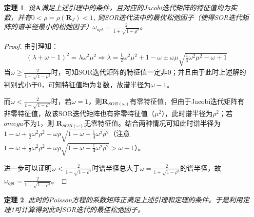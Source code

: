 \documentclass[12pt, a4paper]{article}
\newtheorem{theorem}{定理}
\begin{document}
\begin{theorem}
    设$\mathbf{A}$满足上述引理中的条件，且对应的Jacobi迭代矩阵的特征值均为实数，并有$0<\rho=\rho(\mathbf{R}_J)<1$,
    则SOR迭代法中的最优松弛因子（使得SOR迭代矩阵的谱半径最小的松弛因子）$\omega_{opt}=\frac{2}{1+\sqrt{1-\rho^2}}$。
\end{theorem}
\begin{proof}
由引理知：
    \begin{align}
        (\lambda+\omega-1)^2=\lambda\omega^2\mu^2\Rightarrow\lambda=\frac{1}{2}\omega^2\mu^2+1-\omega\pm\omega\mu\sqrt{\frac{1}{4}\omega^2\mu^2-\omega+1}
    \end{align}
当$\omega\geqslant\frac{2}{1+\sqrt{1-\rho^2}}$时，可知SOR迭代矩阵的特征值一定非0；并且由于此时上述解的判别式小于0，可知特征值均为复数，故谱半径为$\omega-1$。

而$\omega<\frac{2}{1+\sqrt{1-\rho^2}}$时，若$\omega=1$，则$\mathbf{R}_{SOR(\omega)}$有零特征值，但由于Jacobi迭代矩阵有非零特征值，故该SOR迭代矩阵也有非零特征值（$\mu^2$），此时谱半径为$\rho^2$；若$omega$不为1，则
$\mathbf{R}_{SOR(\omega)}$无零特征值。结合两种情况可知此时谱半径为$1-\omega+\frac{1}{2}\omega^2\rho^2+\omega\rho\sqrt{1-\omega+\frac{1}{4}\omega^2\rho^2}$（注意$1-\omega+\frac{1}{2}\omega^2\rho^2+\omega\rho\sqrt{1-\omega+\frac{1}{4}\omega^2\rho^2}>\omega-1$）。

进一步可以证明$\omega<\frac{2}{1+\sqrt{1-\rho^2}}$时谱半径总大于$\omega=\frac{2}{1+\sqrt{1-\rho^2}}$的谱半径，故$\omega_{opt}=\frac{2}{1+\sqrt{1-\rho^2}}$。
\end{proof}
\begin{theorem}
此时的Poisson方程的系数矩阵正满足上述引理和定理的条件。于是利用定理1可计算得到此时SOR迭代的最佳松弛因子。
\end{theorem}
\end{document}
